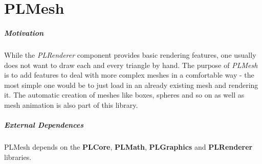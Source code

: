 \chapter{PLMesh}


\paragraph{Motivation}
While the \emph{PLRenderer} component provides basic rendering features, one usually does not want to draw each and every triangle by hand. The purpose of \emph{PLMesh} is to add features to deal with more complex meshes in a comfortable way - the most simple one would be to just load in an already existing mesh and rendering it. The automatic creation of meshes like boxes, spheres and so on as well as mesh animation is also part of this library.


\paragraph{External Dependences}
PLMesh depends on the \textbf{PLCore}, \textbf{PLMath}, \textbf{PLGraphics} and \textbf{PLRenderer} libraries.





\cleardoublepage
